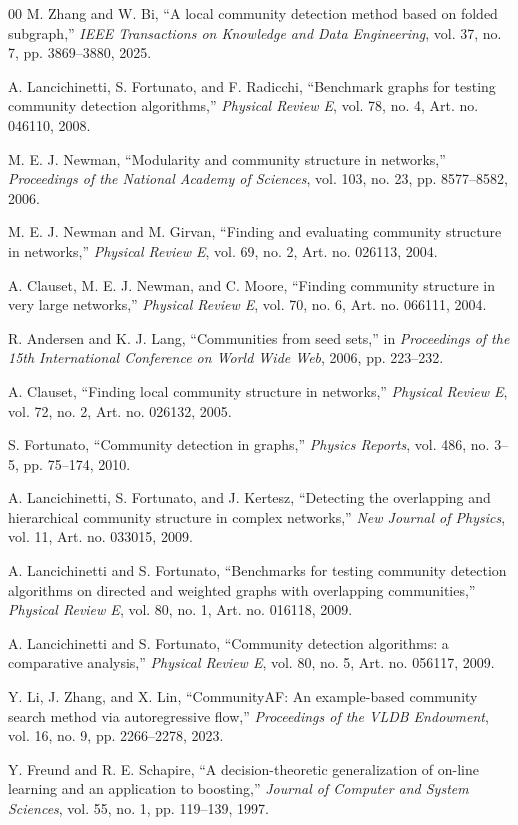\documentclass[10pt,journal,compsoc]{IEEEtran}
\begin{document}
\begin{thebibliography}{00}
M. Zhang and W. Bi, ``A local community detection method based on folded
subgraph,'' \emph{IEEE Transactions on Knowledge and Data Engineering},
vol. 37, no. 7, pp. 3869--3880, 2025.

A. Lancichinetti, S. Fortunato, and F. Radicchi, ``Benchmark graphs for
testing community detection algorithms,'' \emph{Physical Review E}, vol. 78,
no. 4, Art. no. 046110, 2008.

M. E. J. Newman, ``Modularity and community structure in networks,''
\emph{Proceedings of the National Academy of Sciences}, vol. 103, no. 23,
pp. 8577--8582, 2006.

M. E. J. Newman and M. Girvan, ``Finding and evaluating community structure
in networks,'' \emph{Physical Review E}, vol. 69, no. 2, Art. no. 026113,
2004.

A. Clauset, M. E. J. Newman, and C. Moore, ``Finding community structure in
very large networks,'' \emph{Physical Review E}, vol. 70, no. 6, Art. no.
066111, 2004.

R. Andersen and K. J. Lang, ``Communities from seed sets,'' in
\emph{Proceedings of the 15th International Conference on World Wide Web},
2006, pp. 223--232.

A. Clauset, ``Finding local community structure in networks,''
\emph{Physical Review E}, vol. 72, no. 2, Art. no. 026132, 2005.

S. Fortunato, ``Community detection in graphs,'' \emph{Physics Reports},
vol. 486, no. 3--5, pp. 75--174, 2010.

A. Lancichinetti, S. Fortunato, and J. Kertesz, ``Detecting the overlapping
and hierarchical community structure in complex networks,''
\emph{New Journal of Physics}, vol. 11, Art. no. 033015, 2009.

A. Lancichinetti and S. Fortunato, ``Benchmarks for testing community
detection algorithms on directed and weighted graphs with overlapping
communities,'' \emph{Physical Review E}, vol. 80, no. 1, Art. no. 016118,
2009.

A. Lancichinetti and S. Fortunato, ``Community detection algorithms: a
comparative analysis,'' \emph{Physical Review E}, vol. 80, no. 5, Art. no.
056117, 2009.

Y. Li, J. Zhang, and X. Lin, ``CommunityAF: An example-based community
search method via autoregressive flow,'' \emph{Proceedings of the VLDB
Endowment}, vol. 16, no. 9, pp. 2266--2278, 2023.

Y. Freund and R. E. Schapire, ``A decision-theoretic generalization of
on-line learning and an application to boosting,'' \emph{Journal of Computer
and System Sciences}, vol. 55, no. 1, pp. 119--139, 1997.
\end{thebibliography}
\end{document}
